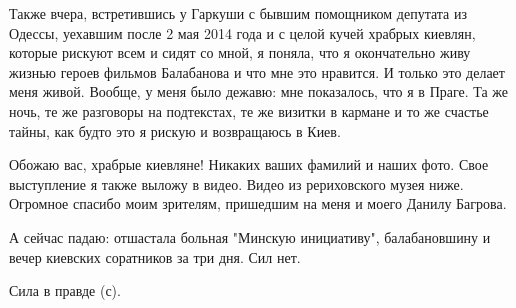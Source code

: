 Также вчера, встретившись у Гаркуши с бывшим помощником депутата из Одессы,
уехавшим после 2 мая 2014 года и с целой кучей храбрых киевлян, которые рискуют
всем и сидят со мной, я поняла, что я окончательно живу жизнью героев фильмов
Балабанова и что мне это нравится. И только это делает меня живой. Вообще, у
меня было дежавю: мне показалось, что я в Праге. Та же ночь, те же разговоры на
подтекстах, те же визитки в кармане и то же счастье тайны, как будто это я
рискую и возвращаюсь в Киев.

Обожаю вас, храбрые киевляне! Никаких ваших фамилий и наших фото. Свое
выступление я также выложу в видео. Видео из рериховского музея ниже. Огромное
спасибо моим зрителям, пришедшим на меня и моего Данилу Багрова.

А сейчас падаю: отшастала больная "Минскую инициативу", балабановшину и вечер
киевских соратников за три дня. Сил нет.

Сила в правде (с).
